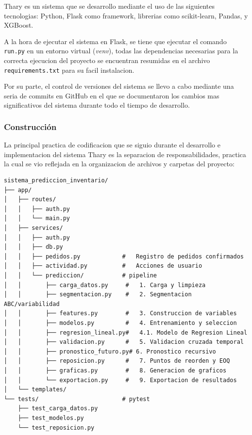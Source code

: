
Thary es un sistema que se desarrollo mediante el uso de las siguientes tecnologias: Python, Flask como framework, librerias como scikit-learn, Pandas, y XGBoost. 

A la hora de ejecutar el sistema en Flask, se tiene que ejecutar el comando \texttt{run.py} en un entorno virtual (\textit{venv}), todas las dependencias necesarias para la correcta ejecucion del proyecto se encuentran resumidas en el archivo \texttt{requirements.txt} para su facil instalacion. 

Por su parte, el control de versiones del sistema se llevo a cabo mediante una seria de commits en GitHub en el que se documentaron los cambios mas significativos del sistema durante todo el tiempo de desarrollo. 

\subsubsection{Construcción}

La principal practica de codificacion que se siguio durante el desarrollo e implementacion del sistema Thary es la separacion de responsabilidades, practica la cual se vio reflejada en la organizacion de archivos y carpetas del proyecto:

\begin{verbatim}
sistema_prediccion_inventario/
├── app/
│   ├── routes/                 
│   │   ├── auth.py            
│   │   └── main.py            
│   ├── services/                
│   │   ├── auth.py              
│   │   ├── db.py                
│   │   ├── pedidos.py            #   Registro de pedidos confirmados
│   │   ├── actividad.py          #   Acciones de usuario
│   │   └── prediccion/           # pipeline
│   │       ├── carga_datos.py     #   1. Carga y limpieza
│   │       ├── segmentacion.py    #   2. Segmentacion ABC/variabilidad
│   │       ├── features.py        #   3. Construccion de variables
│   │       ├── modelos.py         #   4. Entrenamiento y seleccion
│   │       ├── regresion_lineal.py#   4.1. Modelo de Regresion Lineal
│   │       ├── validacion.py      #   5. Validacion cruzada temporal
│   │       ├── pronostico_futuro.py# 6. Pronostico recursivo
│   │       ├── reposicion.py      #   7. Puntos de reorden y EOQ
│   │       ├── graficas.py        #   8. Generacion de graficos
│   │       └── exportacion.py     #   9. Exportacion de resultados
│   └── templates/                
└── tests/                        # pytest
    ├── test_carga_datos.py
    ├── test_modelos.py
    └── test_reposicion.py
\end{verbatim}

